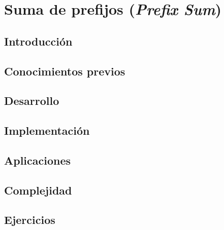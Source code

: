 \chapter{Suma de prefijos (\emph{Prefix Sum})}
\section{Introducción}

\section{Conocimientos previos}

\section{Desarrollo}

\section{Implementación}

\section{Aplicaciones}

\section{Complejidad}

\section{Ejercicios}
